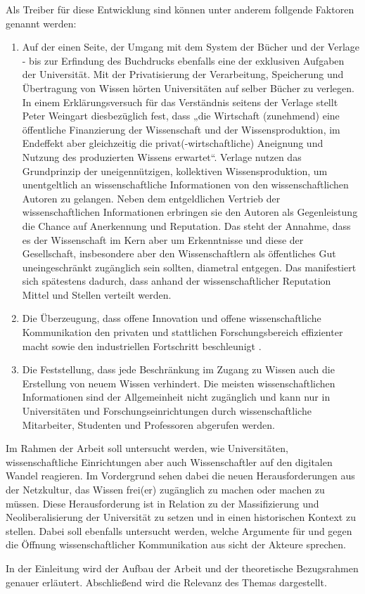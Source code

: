 Als Treiber für diese Entwicklung sind können unter anderem follgende Faktoren genannt werden: 
\begin{enumerate}
\item Auf der einen Seite, der Umgang mit dem System der Bücher und der Verlage - bis zur Erfindung des Buchdrucks ebenfalls eine der exklusiven Aufgaben der Universität. Mit der Privatisierung der Verarbeitung, Speicherung und Übertragung von Wissen hörten Universitäten auf selber Bücher zu verlegen. In einem Erklärungsversuch für das Verständnis seitens der Verlage stellt Peter Weingart diesbezüglich fest, dass „die Wirtschaft (zunehmend) eine öffentliche Finanzierung der Wissenschaft und der Wissensproduktion, im Endeffekt aber gleichzeitig die privat(-wirtschaftliche) Aneignung und Nutzung des produzierten Wissens erwartet“\cite{cite:2}. Verlage nutzen das Grundprinzip der uneigennützigen, kollektiven Wissensproduktion, um unentgeltlich an wissenschaftliche Informationen von den wissenschaftlichen Autoren zu gelangen. Neben dem entgeldlichen Vertrieb der wissenschaftlichen Informationen erbringen sie den Autoren als Gegenleistung die Chance auf Anerkennung und Reputation. Das steht der Annahme, dass es der Wissenschaft im Kern aber um Erkenntnisse und diese der Gesellschaft, insbesondere aber den Wissenschaftlern als öffentliches Gut uneingeschränkt zugänglich sein sollten\cite{cite:3}, diametral entgegen. Das manifestiert sich spätestens dadurch, dass anhand der wissenschaftlicher Reputation Mittel und Stellen verteilt werden\cite{cite:4}.
\item Die Überzeugung, dass offene Innovation und offene wissenschaftliche Kommunikation den privaten und stattlichen Forschungsbereich effizienter macht sowie den industriellen Fortschritt beschleunigt \cite{cite:7}.
\item Die Feststellung, dass jede Beschränkung im Zugang zu Wissen auch die Erstellung von neuem Wissen verhindert\cite{cite:5}\cite{cite:8}.  Die meisten wissenschaftlichen Informationen sind der Allgemeinheit nicht zugänglich und kann nur in Universitäten und Forschungseinrichtungen durch wissenschaftliche Mitarbeiter, Studenten und Professoren abgerufen werden\cite{cite:6}. 
\end{enumerate}	

Im Rahmen der Arbeit soll untersucht werden, wie Universitäten, wissenschaftliche Einrichtungen aber auch Wissenschaftler auf den digitalen Wandel reagieren. Im Vordergrund sehen dabei die neuen Herausforderungen aus der Netzkultur, das Wissen frei(er) zugänglich zu machen oder machen zu müssen. Diese Herausforderung ist in Relation zu der Massifizierung und Neoliberalisierung der Universität zu setzen und in einen historischen Kontext zu stellen. Dabei soll ebenfalls untersucht werden, welche Argumente für und gegen die Öffnung wissenschaftlicher Kommunikation aus sicht der Akteure sprechen.

In der Einleitung wird der Aufbau der Arbeit und der theoretische Bezugsrahmen genauer erläutert. Abschließend wird die Relevanz des Themas dargestellt.

